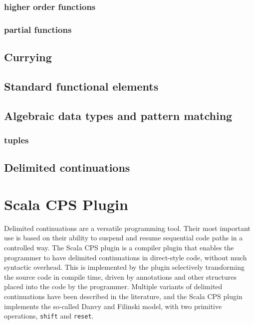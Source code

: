 \subsubsection{higher order functions}
\subsubsection{partial functions}

\subsection{Currying}

\subsection{Standard functional elements}

\subsection{Algebraic data types and pattern matching}

\subsubsection{tuples}

\subsection{Delimited continuations}

\section{Scala CPS Plugin}

Delimited continuations are a versatile programming tool. Their most important use is based on their ability to suspend and resume sequential code paths in a controlled way. The Scala CPS plugin is a compiler plugin that enables the programmer to have delimited continuations in direct-style code, without much syntactic overhead. This is implemented by the plugin selectively transforming the source code in compile time, driven by annotations and other structures placed into the code by the programmer. Multiple variants of delimited continuations have been described in the literature, and the Scala CPS plugin implements the so-called Danvy and Filinski model, with two primitive operations, \texttt{shift} and \texttt{reset}.

